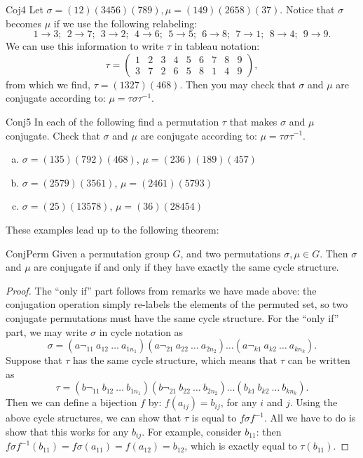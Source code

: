 \begin{example}{Coj4}
Let $\sigma = (12)(3456)(789), \mu = (149)(2658)(37)$.  Notice that $\sigma$ becomes $\mu$ if we use the following relabeling:
$$ 1 \rightarrow 3;~~2 \rightarrow 7;~~3\rightarrow 2;~~4\rightarrow 6;~~5\rightarrow 5;~~6\rightarrow 8;~~7\rightarrow 1;~~8\rightarrow 4;~~9\rightarrow 9.$$
We can use this information to write $\tau$ in tableau notation:
$$ \tau =\begin{pmatrix} 1&2&3&4&5&6&7&8&9 \\ 3&7&2&6&5&8&1&4&9 \end{pmatrix}, $$
from which we find, $\tau=(1327)(468)$.  Then you may check that $\sigma$ and $\mu$ are conjugate according to: $\mu = \tau \sigma \tau^{-1}$.
\end{example}
\begin{exercise}{Conj5}
In each of the following find a permutation $\tau$ that makes $\sigma$ and $\mu$ conjugate.  Check that $\sigma$ and $\mu$ are conjugate according to: $\mu = \tau \sigma \tau^{-1}$.

\begin {enumerate}[(a)]
\item $\sigma=(135)(792)(468)$, $\mu=(236)(189)(457)$
\item $\sigma=(2579)(3561)$, $\mu=(2461)(5793)$
\item $\sigma=(25)(13578)$, $\mu=(36)(28454)$
\end{enumerate}
\end{exercise}
These examples lead up to the following theorem:

\begin{prop}{ConjPerm} Given a permutation group $G$, and two permutations $\sigma, \mu \in G$.  Then $\sigma$ and $\mu$ are conjugate if and only if they have exactly the same cycle structure.
\end{prop}
\begin{proof}
The ``only if'' part follows from remarks we have made above: the conjugation operation simply re-labels the elements of the permuted set, so two conjugate permutations must have the same cycle structure.
For the ``only if'' part, we may write $\sigma$ in cycle notation as
$$\sigma = (a¬_{11}~a_{12}~\ldots~a_{1n_1})(a¬_{21}~a_{22}~\ldots~a_{2n_2})  \ldots(a¬_{k1}~a_{k2}~\ldots~a_{k n_k}).$$  
Suppose that $\tau$ has the same cycle structure, which means that $\tau$ can be written as
$$\tau = (b¬_{11}~b_{12}~\ldots~b_{1n_1})(b¬_{21}~b_{22}~\ldots~b_{2n_2})  \ldots(b_{k1}~b_{k2}~\ldots~b_{k n_k}).$$
Then we can define a bijection $f$ by: $f(a_{ij}) = b_{ij}$, for any $i$ and $j$. Using the above cycle structures, we can show that $\tau$ is equal to $f \sigma f^{-1}$.  All we have to do is show that this works for any $ b_{ij}$.  For example, consider $b_{11}$: then $f \sigma f^{-1}( b_{11}) = f \sigma ( a_{11}) = f ( a_{12})= b_{12}$, which is exactly equal to $ \tau(b_{11})$.
\end{proof}

